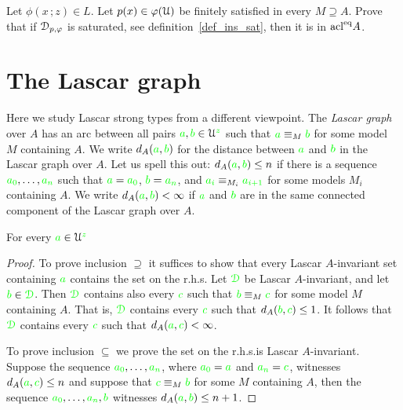 \begin{exercise}
  Let $\phi(x\,;z)\in L$.
  Let $p(x)\in\varphi(\EuScript U)$ be finitely satisfied in every $M\supseteq A$.
  Prove that if $\EuScript D_{p,\varphi}$ is saturated, see definition~\ref{def_ins_sat}, then it is in $\mathop{\rm acl}^{{\rm eq}}\!A$.
\end{exercise}
\section{The Lascar graph}\label{lascar_graph}

Here we study Lascar strong types from a different viewpoint.
The \emph{Lascar graph\/} over $A$ has an arc between all pairs ${\color{green} a},{\color{green} b}\in \EuScript U^{\color{green} z}$ such that  ${\color{green} a}\equiv_M{\color{green} b}$ for some model $M$ containing $A$.
We write \emph{$d_A({\color{green} a},{\color{green} b})$\/} for the distance between ${\color{green} a}$ and ${\color{green} b}$ in the Lascar graph over $A$.
Let us spell this out: $d_A({\color{green} a},{\color{green} b})\le n$ if there is a sequence ${\color{green} a_0},\dots,{\color{green} a_n}$ such that ${\color{green} a}={\color{green} a_0}$, ${\color{green} b}={\color{green} a_n}$, and ${\color{green} a_i}\equiv_{M_i}{\color{green} a_{i+1}}$ for some models $M_i$ containing $A$.
We write \emph{$d_A({\color{green} a},{\color{green} b})<\infty$\/} if ${\color{green} a}$ and ${\color{green} b}$ are in the same connected component of the Lascar graph over $A$.

\begin{proposition}\label{tipoforteLascarediametro} For every ${\color{green} a}\in\EuScript U^{\color{green} z}$

\end{proposition}


\begin{proof}
To prove inclusion $\supseteq$ it suffices to show that every Lascar $A$-invariant set containing ${\color{green} a}$ contains the set on the r.h.s.
Let ${\color{green}\EuScript D}$ be Lascar $A$-invariant, and let ${\color{green} b}\in{\color{green}\EuScript D}$.
Then ${\color{green}\EuScript D}$ contains also every ${\color{green} c}$ such that ${\color{green} b}\equiv_M{\color{green} c}$ for some model $M$ containing $A$.
That is, ${\color{green}\EuScript D}$ contains every ${\color{green} c}$ such that $d_A({\color{green} b},{\color{green} c})\le 1$.
It follows that ${\color{green}\EuScript D}$ contains every ${\color{green} c}$ such that $d_A({\color{green} a},{\color{green} c})<\infty$. 

To prove inclusion $\subseteq$ we prove the set on the r.h.s.\@ is Lascar $A$-invariant.
Suppose the sequence ${\color{green} a_0},\dots,{\color{green} a_n}$, where ${\color{green} a_0}={\color{green} a}$ and ${\color{green} a_n}={\color{green} c}$, witnesses $d_A({\color{green} a},{\color{green} c})\le n$ and suppose that ${\color{green} c}\equiv_M{\color{green} b}$ for some $M$ containing $A$, then the sequence ${\color{green} a_0},\dots,{\color{green} a_n},{\color{green} b}$ witnesses $d_A({\color{green} a},{\color{green} b})\le n+1$.
\end{proof}

